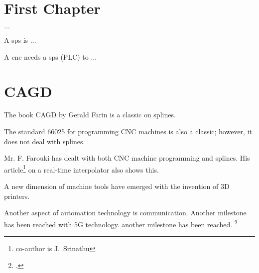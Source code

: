 %
%
%



\chapter{First Chapter}

$\ldots$

A \ac{sps} is $\ldots$
\bigskip


A \ac{cnc} needs a \ac{sps}  (PLC)  to $\ldots$

\chapter{CAGD}

\blindtext

The book CAGD by Gerald Farin is a classic on splines. \cite{Farin:2002}

\bigskip

The standard 66025 for programming CNC machines is also a classic; however, it does not deal with splines. \cite{DIN66025}

\bigskip

Mr. F. Farouki has dealt with both CNC machine programming and splines. His article\footnote{co-author is J.~Srinathu} on a real-time interpolator also shows this. \cite{Farouki:2017}

\bigskip

A new dimension of machine tools have emerged with the invention of 3D printers. \cite{Patent3D}

\bigskip


Another aspect of automation technology is communication. Another milestone has been reached with 5G technology.
another milestone has been reached. \footcite{Zafeiropoulos:2020}


